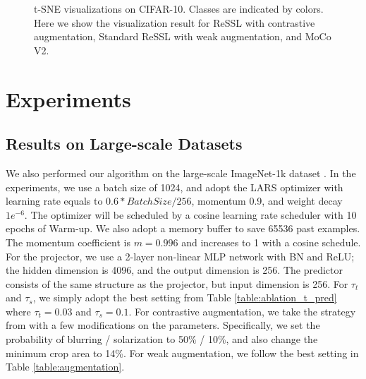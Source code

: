 \documentclass{article}
\newcommand{\<}{\left\langle}
\renewcommand{\>}{\right\rangle}
\begin{document}
\begin{figure*}[h]
    \vspace{-10pt}
    \centering
    \caption{t-SNE visualizations on CIFAR-10. Classes are indicated by colors. Here we show the visualization result for ReSSL with contrastive augmentation, Standard ReSSL with weak augmentation, and MoCo V2. }
    \vspace{-10pt}
    \label{fig:tsne}
\end{figure*}

 \section{Experiments}

\subsection{Results on Large-scale Datasets}
We also performed our algorithm on the large-scale ImageNet-1k dataset \cite{imagenet_cvpr09}. In the experiments, we use a batch size of 1024, and adopt the LARS \cite{lars} optimizer with learning rate equals to $0.6 * BatchSize / 256$, momentum 0.9, and weight decay $1e^{-6}$. The optimizer will be scheduled by a cosine learning rate scheduler \cite{cosine_lr} with 10 epochs of Warm-up. We also adopt a memory buffer to save 65536 past examples. The momentum coefficient is $m=0.996$ and increases to 1 with a cosine schedule. For the projector, we use a 2-layer non-linear MLP network with BN and ReLU; the hidden dimension is 4096, and the output dimension is 256. The predictor consists of the same structure as the projector, but input dimension is 256.  For $\tau_t$ and $\tau_s$, we simply adopt the best setting from Table \ref{table:ablation_t_pred} where $\tau_t = 0.03$ and $\tau_s = 0.1$. For contrastive augmentation, we take the strategy from \cite{byol} with a few modifications on the parameters. Specifically, we set the probability of blurring / solarization to 50\% / 10\%, and also change the minimum crop area to 14\%. For weak augmentation, we follow the best setting in Table \ref{table:augmentation}. 
\end{document}
